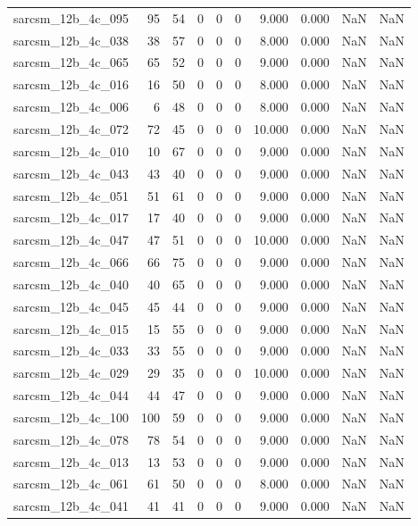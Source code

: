 \documentclass{article}
\begin{document}
\begin{longtable}{lrrrrrrrrr}
sarcsm\_12b\_4c\_095 & 95 & 54 & 0 & 0 & 0 & 9.000 & 0.000 & NaN & NaN \\
sarcsm\_12b\_4c\_038 & 38 & 57 & 0 & 0 & 0 & 8.000 & 0.000 & NaN & NaN \\
sarcsm\_12b\_4c\_065 & 65 & 52 & 0 & 0 & 0 & 9.000 & 0.000 & NaN & NaN \\
sarcsm\_12b\_4c\_016 & 16 & 50 & 0 & 0 & 0 & 8.000 & 0.000 & NaN & NaN \\
sarcsm\_12b\_4c\_006 & 6 & 48 & 0 & 0 & 0 & 8.000 & 0.000 & NaN & NaN \\
sarcsm\_12b\_4c\_072 & 72 & 45 & 0 & 0 & 0 & 10.000 & 0.000 & NaN & NaN \\
sarcsm\_12b\_4c\_010 & 10 & 67 & 0 & 0 & 0 & 9.000 & 0.000 & NaN & NaN \\
sarcsm\_12b\_4c\_043 & 43 & 40 & 0 & 0 & 0 & 9.000 & 0.000 & NaN & NaN \\
sarcsm\_12b\_4c\_051 & 51 & 61 & 0 & 0 & 0 & 9.000 & 0.000 & NaN & NaN \\
sarcsm\_12b\_4c\_017 & 17 & 40 & 0 & 0 & 0 & 9.000 & 0.000 & NaN & NaN \\
sarcsm\_12b\_4c\_047 & 47 & 51 & 0 & 0 & 0 & 10.000 & 0.000 & NaN & NaN \\
sarcsm\_12b\_4c\_066 & 66 & 75 & 0 & 0 & 0 & 9.000 & 0.000 & NaN & NaN \\
sarcsm\_12b\_4c\_040 & 40 & 65 & 0 & 0 & 0 & 9.000 & 0.000 & NaN & NaN \\
sarcsm\_12b\_4c\_045 & 45 & 44 & 0 & 0 & 0 & 9.000 & 0.000 & NaN & NaN \\
sarcsm\_12b\_4c\_015 & 15 & 55 & 0 & 0 & 0 & 9.000 & 0.000 & NaN & NaN \\
sarcsm\_12b\_4c\_033 & 33 & 55 & 0 & 0 & 0 & 9.000 & 0.000 & NaN & NaN \\
sarcsm\_12b\_4c\_029 & 29 & 35 & 0 & 0 & 0 & 10.000 & 0.000 & NaN & NaN \\
sarcsm\_12b\_4c\_044 & 44 & 47 & 0 & 0 & 0 & 9.000 & 0.000 & NaN & NaN \\
sarcsm\_12b\_4c\_100 & 100 & 59 & 0 & 0 & 0 & 9.000 & 0.000 & NaN & NaN \\
sarcsm\_12b\_4c\_078 & 78 & 54 & 0 & 0 & 0 & 9.000 & 0.000 & NaN & NaN \\
sarcsm\_12b\_4c\_013 & 13 & 53 & 0 & 0 & 0 & 9.000 & 0.000 & NaN & NaN \\
sarcsm\_12b\_4c\_061 & 61 & 50 & 0 & 0 & 0 & 8.000 & 0.000 & NaN & NaN \\
sarcsm\_12b\_4c\_041 & 41 & 41 & 0 & 0 & 0 & 9.000 & 0.000 & NaN & NaN \\

\end{longtable}
\end{document}
